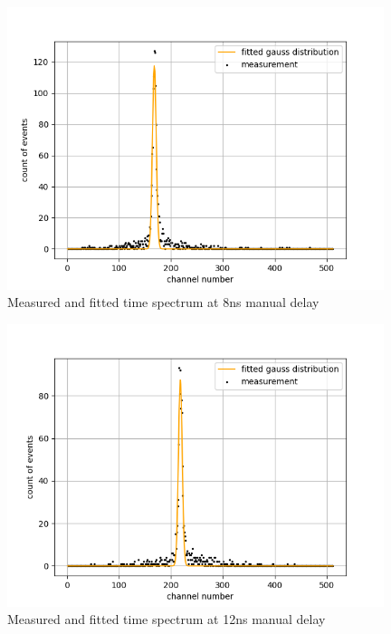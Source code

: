 \begin{figure}[H]
    \centering
    \includegraphics[width=110mm,scale=0.5]{Positronium/include/timecalibration2.png}
    \caption{Measured and fitted time spectrum at 8ns manual delay} 
   
\end{figure}

\begin{figure}[H]
    \centering
    \includegraphics[width=110mm,scale=0.5]{Positronium/include/timecalibration3.png}
    \caption{Measured and fitted time spectrum at 12ns manual delay} 
    
\end{figure}

